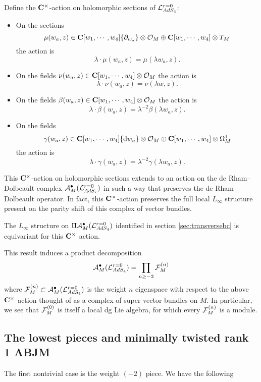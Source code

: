 \documentclass[../main.tex]{subfiles}
\begin{document}
Define the $\mathbf{C}^\times$-action on holomorphic sections of $\mathcal L_{AdS_4}^{r=0}$:
\begin{itemize}
\item On the sections 
\[
\mu(w_a,z) \in \mathbf{C}[w_1, \cdots, w_4]\{\partial_{w_a}\} \otimes \mathcal O_M \oplus \mathbf{C}[w_1, \cdots, w_4]\otimes T_M \] 
the action is
\[
\lambda \cdot \mu(w_a,z) = \mu(\lambda w_a , z).
\]
\item On the fields $\nu(w_a,z) \in \mathbf{C}[w_1, \cdots, w_4] \otimes \mathcal O_M$ the action is
\[
\lambda \cdot \nu(w_a,z) = \nu(\lambda w , z).
\]
\item On the fields $\beta(w_a,z) \in  \mathbf{C}[w_1, \cdots, w_4] \otimes \mathcal O_M$ the action is
\[
\lambda \cdot \beta(w_a,z) = \lambda^{-2} \beta(\lambda w_a , z).
\]
\item On the fields 
\[
\gamma(w_a,z) \in  \mathbf{C}[w_1, \cdots, w_4] \{\mathrm{d} w_a\} \otimes \mathcal O_M \oplus  \mathbf{C}[w_1, \cdots, w_4] \otimes \Omega^1_M
\] 
the action is
\[
\lambda \cdot \gamma(w_a,z) = \lambda^{-2} \gamma(\lambda w _a, z).
\]
\end{itemize}

This $\mathbf{C}^\times$-action on holomorphic sections extends to an action on the de Rham--Dolbeault complex $\mathcal A^\bullet_M(\mathcal L_{AdS_7}^{r=0})$ in such a way that preserves the de Rham--Dolbeault operator.
In fact, this $\mathbf{C}^\times$-action preserves the full local $L_\infty$ structure present on the parity shift of this complex of vector bundles.

\begin{prop}\label{prop:ads4decomp}
The $L_\infty$ structure on $\Pi \mathcal A_M^\bullet(\mathcal{L}^{r=0}_{AdS_4} )$ identified in section \ref{sec:transversebc} is equivariant for this $\mathbf{C}^\times$ action.
\end{prop}

This result induces a product decomposition 
\[
 \mathcal A_M^\bullet(\mathcal{L}^{r=0}_{AdS_4} ) = \prod _{n\geq -2} \mathcal{F}^{(n)}_{M}
\]
where $\mathcal F^{(n)}_M \subset \mathcal A_M^\bullet(\mathcal{L}^{r=0}_{AdS_4} )$ is the weight $n$ eigenspace with respect to the above $\mathbf{C}^\times$ action thought of as a complex of super vector bundles on $M$. 
In particular, we see that $\mathcal{F}^{(0)}_{M}$ is itself a local dg Lie algebra, for which  every $\mathcal{F}^{(n)}_{M}$ is a module.

\subsection{The lowest pieces and minimally twisted rank 1 ABJM}\label{sec:BLG}
\parsec[] The first nontrivial case is the weight ${(-2)}$ piece. We have the following
\end{document}
